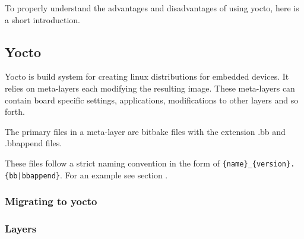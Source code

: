 \documentclass[../../main.tex]{subfiles}
\begin{document}
To properly understand the advantages and disadvantages of using yocto, here is a short introduction.

\subsection{Yocto}%
\label{sub:yocto}

Yocto is build system for creating linux distributions for embedded devices. It relies on meta-layers
each modifying the resulting image. These meta-layers can contain board specific settings,
applications, modifications to other layers and so forth.

The primary files in a meta-layer are bitbake files with the extension .bb and .bbappend files.

These files follow a strict naming convention in the form of
\texttt{\{name\}\_\{version\}.\{bb|bbappend\}}. For an example see section .



%
%
%
%
%


\subsubsection{Migrating to yocto}%
\label{ssub:migrating_to_yocto}




\subsubsection{Layers}%
\label{ssub:layers}
\end{document}
